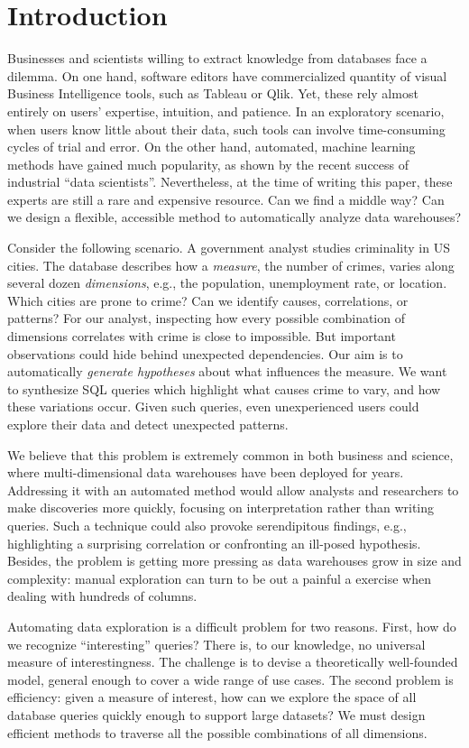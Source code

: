 \section{Introduction}
\label{sec:intro}
Businesses and scientists willing to extract knowledge from databases face a
dilemma. On one hand, software editors have commercialized quantity of visual
Business Intelligence tools, such as Tableau or Qlik. Yet, these rely almost
entirely on users' expertise, intuition, and patience. In an exploratory
scenario, when users know little about their data, such tools can involve
time-consuming cycles of trial and error. On the other hand, automated, machine
learning methods have gained much popularity, as shown by the recent success of
industrial ``data scientists''. Nevertheless, at the time of writing this
paper, these experts are still a rare and expensive resource. Can we find a
middle way? Can we design a flexible, accessible method to automatically
analyze data warehouses?

Consider the following scenario. A government analyst studies criminality in US
cities. The database describes how a \emph{measure}, the number of crimes,
varies along several dozen \emph{dimensions}, e.g., the population,
unemployment rate, or location.  Which cities are prone to crime?  Can we
identify causes, correlations, or patterns? For our analyst, inspecting how
every possible combination of dimensions correlates with crime is close to
impossible. But important observations could hide behind unexpected dependencies.
Our aim is to automatically \emph{generate hypotheses} about what influences
the measure.  We want to synthesize SQL queries which highlight what causes
crime to vary, and how these variations occur. Given such queries, even
unexperienced users could explore their data and detect unexpected patterns.

We believe that this problem is extremely common in both business and science,
where multi-dimensional data warehouses have been deployed for years.
Addressing it with an automated method would allow analysts and researchers to
make discoveries more quickly, focusing on interpretation rather than writing
queries. Such a technique could also provoke serendipitous findings, e.g.,
highlighting a surprising correlation or confronting an ill-posed hypothesis.
Besides, the problem is getting more pressing as data warehouses grow in size
and complexity: manual exploration can turn to be out a painful a exercise when
dealing with hundreds of columns.

Automating data exploration is a difficult problem for two reasons.  First, how
do we recognize ``interesting'' queries?  There is, to our knowledge, no
universal measure of inte\-restingness. The challenge is to devise a
theoretically well-founded model, general enough to cover a wide range of use
cases. The second problem is efficiency: given a measure of interest, how can
we explore the space of all database queries quickly enough to support large
datasets? We must design efficient methods to traverse all the possible
combinations of all dimensions.

